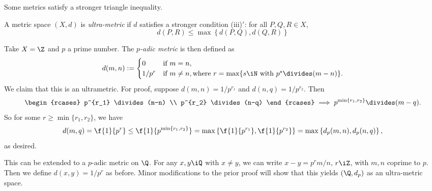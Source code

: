 Some metrics satisfy a stronger triangle inequality.

\begin{definition}
	A metric space $(X,d)$ is \emph{ultra-metric} if $d$ satisfies a stronger condition (iii)$'$: for all $P,Q,R \in X$, %
	\begin{equation*}
		d(P,R)\leq \max \left\{ d(P,Q),d(Q,R) \right\}
	\end{equation*}
\end{definition}

\begin{example}
	Take $X=\Z$ and $p$ a prime number. The \emph{$p$-adic metric} is then defined as %
	\begin{equation*}
		d(m,n) :=
		\begin{cases}
			0 & \text{if } m=n, \\ %
			1/p^r & \text{if } m\neq n, \text{where } r=\max\{s\iN \text{ with } p^s \divides (m-n)\}. %
		\end{cases}
	\end{equation*}
	We claim that this is an ultrametric. For proof, suppose $d(m,n)=1/p^{r_1}$ and $d(n,q) = 1/p^{r_2}$. Then %
	\begin{align*}
		\begin{rcases}
			p^{r_1} \divides (m-n) \\ %
			p^{r_2} \divides (n-q)
		\end{rcases}
		\implies p^{\min\{r_1,r_2\}} \divides (m-q).
	\end{align*}
	So for some $r\geq \min\{r_1,r_2\}$, we have
	\begin{equation*}
		d(m,q)
		= \f{1}{p^r}
		\leq \f{1}{p^{\min\{r_1,r_2\}}}
		= \max \left\{ \f{1}{p^{r_1}}, \f{1}{p^{r_2}} \right\}
		= \max\left\{d_p(m,n), d_p(n,q) \right\},
	\end{equation*}
	as desired.
	

	This can be extended to a $p$-adic metric on $\Q$. For any $x,y\iQ$ with $x\neq y$, we can write $x-y = p^r m/n$, $r\iZ$, with $m,n$ coprime to $p$. Then we define $d(x,y) = 1/p^r$ as before. Minor modifications to the prior proof will show that this yields $(\Q,d_p)$ as an ultra-metric space.
\end{example}

